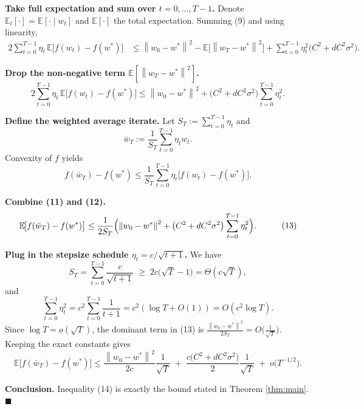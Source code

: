 \documentclass[11pt]{article}
\newcommand{\E}{\mathbb{E}}
\newcommand{\norm}[1]{\left\lVert#1\right\rVert}
\begin{document}
\begin{enumerate}[label={[\textbf{Step \arabic*}]}]
\item \textbf{Take full expectation and sum over $t=0,\dots,T-1$.}
Denote $\E_t[\cdot]=\E[\cdot\mid w_t]$ and $\E[\cdot]$ the total expectation.
Summing (9) and using linearity,
\[
\begin{aligned}
2\sum_{t=0}^{T-1}\eta_t\,\E\!\bigl[f(w_t)-f(w^{*})\bigr]
&\le \norm{w_0-w^{*}}^{2}
-\E\!\bigl[\norm{w_T-w^{*}}^{2}\bigr]
+\sum_{t=0}^{T-1}\eta_t^{2}\bigl(C^{2}+dC^{2}\sigma^{2}\bigr) .
\end{aligned}
\tag{10}
\]

\item \textbf{Drop the non‑negative term $\E[\norm{w_T-w^{*}}^{2}]$.}
\[
2\sum_{t=0}^{T-1}\eta_t\,\E\!\bigl[f(w_t)-f(w^{*})\bigr]
\le \norm{w_0-w^{*}}^{2}
+\bigl(C^{2}+dC^{2}\sigma^{2}\bigr)\sum_{t=0}^{T-1}\eta_t^{2}.
\tag{11}
\]

\item \textbf{Define the weighted average iterate.}
Let $S_T:=\sum_{t=0}^{T-1}\eta_t$ and
\[
\bar w_T:=\frac{1}{S_T}\sum_{t=0}^{T-1}\eta_t w_t .
\]
Convexity of $f$ yields
\[
f(\bar w_T)-f(w^{*})\le\frac{1}{S_T}\sum_{t=0}^{T-1}\eta_t\bigl[f(w_t)-f(w^{*})\bigr].
\tag{12}
\]

\item \textbf{Combine (11) and (12).}
\[
\begin{aligned}
\E\!\bigl[f(\bar w_T)-f(w^{*})\bigr]
&\le\frac{1}{2S_T}\Bigl(\norm{w_0-w^{*}}^{2}
+\bigl(C^{2}+dC^{2}\sigma^{2}\bigr)\sum_{t=0}^{T-1}\eta_t^{2}\Bigr).
\end{aligned}
\tag{13}
\]

\item \textbf{Plug in the stepsize schedule $\eta_t=c/\sqrt{t+1}$.}
We have
\[
S_T=\sum_{t=0}^{T-1}\frac{c}{\sqrt{t+1}}\;\ge\;2c\bigl(\sqrt{T}-1\bigr)=\Theta(c\sqrt{T}),
\]
and
\[
\sum_{t=0}^{T-1}\eta_t^{2}=c^{2}\sum_{t=0}^{T-1}\frac{1}{t+1}=c^{2}(\log T+O(1))=O(c^{2}\log T).
\]
Since $\log T = o(\sqrt{T})$, the dominant term in (13) is $\frac{\norm{w_0-w^{*}}^{2}}{2S_T}=O\!\bigl(\frac{1}{\sqrt{T}}\bigr)$. Keeping the exact constants gives
\[
\E\!\bigl[f(\bar w_T)-f(w^{*})\bigr]
\le
\frac{\norm{w_0-w^{*}}^{2}}{2c}\frac{1}{\sqrt{T}}
\;+\;
\frac{c\bigl(C^{2}+dC^{2}\sigma^{2}\bigr)}{2}\frac{1}{\sqrt{T}}
\;+\;o\!\bigl(T^{-1/2}\bigr).
\tag{14}
\]

\item \textbf{Conclusion.} Inequality (14) is exactly the bound stated in Theorem \ref{thm:main}. \hfill $\blacksquare$
\end{enumerate}
\end{document}
